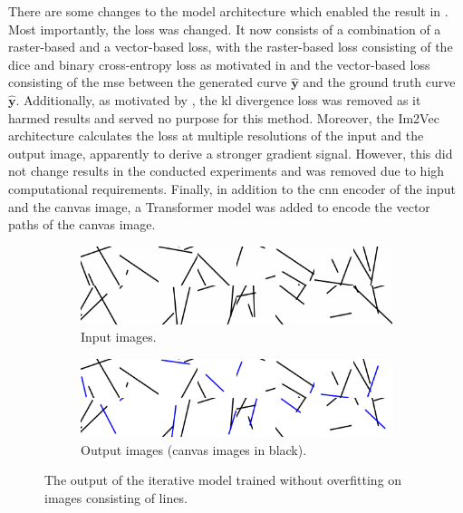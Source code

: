 There are some changes to the model architecture which enabled the result in . Most importantly, the loss was changed. It now consists of a combination of a raster-based and a vector-based loss, with the raster-based loss consisting of the dice and binary cross-entropy loss as motivated in  and the vector-based loss consisting of the \gls{mse} between the generated curve $\hat{\mathbf{y}}$ and the ground truth curve $\hat{\mathbf{y}}$. Additionally, as motivated by , the \gls{kl} divergence loss was removed as it harmed results and served no purpose for this method. Moreover, the Im2Vec \citep{DBLP:conf/cvpr/Reddy21} architecture calculates the loss at multiple resolutions of the input and the output image, apparently to derive a stronger gradient signal. However, this did not change results in the conducted experiments and was removed due to high computational requirements. Finally, in addition to the \gls{cnn} encoder of the input and the canvas image, a Transformer \citep{DBLP:conf/nips/VaswaniSPUJGKP17} model was added to encode the vector paths of the canvas image.

\begin{figure}
    \centering
    \begin{subfigure}{.45\textwidth}
        \includegraphics[width=\textwidth]{graphics/work-artifacts/iterative/server/135/real_images.png}
        \caption{Input images.}
    \end{subfigure}
    \begin{subfigure}{.45\textwidth}
        \includegraphics[width=\textwidth]{graphics/work-artifacts/iterative/server/135/generated_images.png}
        \caption{Output images (canvas images in black).}
    \end{subfigure}
    \caption{The output of the iterative model trained without overfitting on images consisting of lines.}
    \label{fig:iterative.server.135.recons}
\end{figure}

